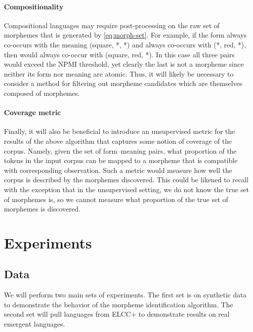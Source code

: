 \paragraph{Compositionality}
Compositional languages may require post-processing on the raw set of morphemes that is generated by \cref{eq:morph-set}.
For example, if the form  always co-occurs with the meaning (square, *, *) and  always co-occurs with (*, red, *), then  would always co-occur with (square, red, *).
In this case all three pairs would exceed the NPMI threshold, yet clearly the last is not a morpheme since neither its form nor meaning are atomic.
Thus, it will likely be necessary to consider a method for filtering out morpheme candidates which are themselves composed of morphemes.

\paragraph{Coverage metric}
Finally, it will also be beneficial to introduce an unsupervised metric for the results of the above algorithm that captures some notion of coverage of the corpus.
Namely, given the set of form--meaning pairs, what proportion of the tokens in the input corpus can be mapped to a morpheme that is compatible with corresponding observation.
Such a metric would measure how well the corpus is described by the morphemes discovered.
This could be likened to recall with the exception that in the unsupervised setting, we do not know the true set of morphemes is, so we cannot measure what proportion of the true set of morphemes is discovered.




\section{Experiments}

\subsection{Data}

We will perform two main sets of experiments.
The first set is on synthetic data to demonstrate the behavior of the morpheme identification algorithm.
The second set will pull languages from ELCC+ to demonstrate results on real emergent languages.

